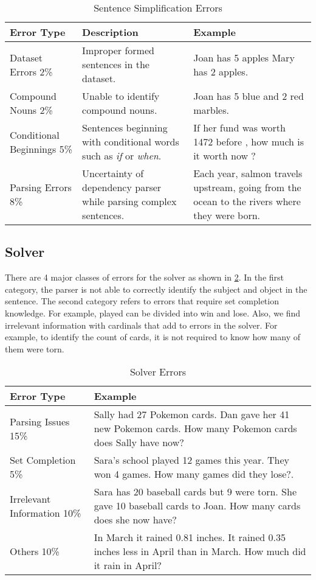 \documentclass[11pt]{article}
\begin{document}
\begin{table}[h!]
\centering
\begin{tabular}{|m{2cm}|m{2cm}|m{2cm}|}
\hline
\textbf{\small Error Type} & \textbf{\small Description} & \textbf{\small Example}  \\ \hline
\small Dataset Errors 2\% &\small Improper formed sentences in the dataset. & \small Joan has 5 apples Mary has 2 apples. \\ \hline
\small Compound Nouns 2\% & \small Unable to identify compound nouns. & \small Joan has 5 blue and 2 red marbles. \\ \hline
\small Conditional Beginnings 5\% & \small Sentences beginning with conditional words such as \textit{if} or \textit{when}. & \small If her fund was worth 1472 before , how much is it worth now ? \\ \hline
\small Parsing Errors 8\% & \small Uncertainty of dependency parser while parsing complex sentences. & \small Each year, salmon travels upstream, going from the ocean to the rivers where they were born.\\ \hline
\end{tabular}
\caption{Sentence Simplification Errors}
\label{figure:16}
\end{table}

\subsection{Solver}
There are 4 major classes of errors for the solver as shown in \ref{figure:17}. In the first category, the parser is not able to correctly identify the subject and object in the sentence. The second category refers to errors that require set completion knowledge. For example, played can be divided into win and lose. Also, we find irrelevant information with cardinals that add to errors in the solver. For example, to identify the count of cards, it is not required to know how many of them were torn.
\begin{table}[h!]
\centering
\begin{tabular}{|m{2cm}|m{4 cm}|}
\hline
 \textbf{\small Error Type} & \textbf{\small Example}\\ \hline
\small Parsing Issues 15\% & \small Sally had 27 Pokemon cards. Dan gave her 41 new Pokemon cards. How many Pokemon cards does Sally have now? \\ \hline
\small Set Completion 5\% &\small  Sara's school played 12 games this year. They won 4 games. How many games did they lose?. \\ \hline
\small Irrelevant Information 10\% & \small Sara has 20 baseball cards but 9 were torn. She gave 10 baseball cards to Joan. How many cards does she now have? \\ \hline
\small Others 10\% & \small In March it rained 0.81 inches. It rained 0.35 inches less in April than in March. How much did it rain in April?  \\ \hline
\end{tabular}
\caption{Solver Errors}
\label{figure:17}
\end{table}
\end{document}
